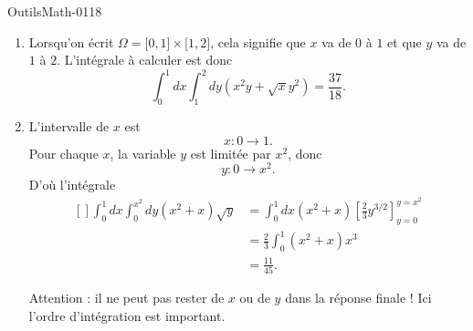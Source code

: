 
\begin{corrige}{OutilsMath-0118}

    \begin{enumerate}
        \item
            Lorsqu'on écrit \( \Omega=\mathopen[ 0 , 1 \mathclose]\times \mathopen[ 1 , 2 \mathclose]\), cela signifie que \( x\) va de \( 0\) à \( 1\) et que \( y\) va de \( 1\) à \( 2\). L'intégrale à calculer est donc
            \begin{equation}
                \int_0^1dx\int_1^2dy (x^2y+\sqrt{x}y^2)=\frac{ 37 }{18}.
            \end{equation}
        \item

            L'intervalle de \( x\) est
            \begin{equation}
                x\colon 0\to 1.
            \end{equation}
            Pour chaque \( x\), la variable \( y\) est limitée par \( x^2\), donc
            \begin{equation}
                y\colon 0\to x^2.
            \end{equation}
            D'où l'intégrale
            \begin{equation}
                \begin{aligned}[]
                    \int_0^1dx\int_0^{x^2}dy(x^2+x)\sqrt{y}&=\int_0^1dx(x^2+x)\left[ \frac{ 2 }{ 3 }y^{3/2} \right]_{y=0}^{y=x^2}\\
                    &=\frac{ 2 }{ 3 }\int_0^1(x^2+x)x^3\\
                    &=\frac{ 11 }{ 45 }.
                \end{aligned}
            \end{equation}

            Attention : il ne peut pas rester de \( x\) ou de \( y\) dans la réponse finale ! Ici l'ordre d'intégration est important.
            
    \end{enumerate}
    

\end{corrige}
